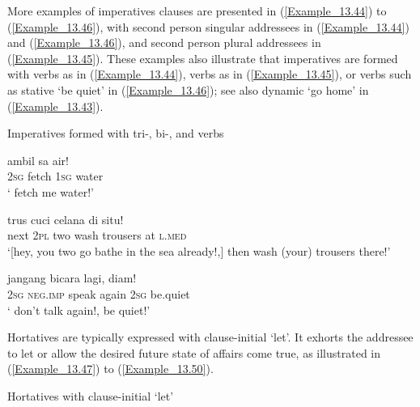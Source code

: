 More examples of imperatives clauses are presented in (\ref{Example_13.44}) to (\ref{Example_13.46}), with second person singular addressees in (\ref{Example_13.44}) and (\ref{Example_13.46}), and second person plural addressees in (\ref{Example_13.45}). These examples also illustrate that imperatives are formed with  verbs as in (\ref{Example_13.44}),  verbs as in (\ref{Example_13.45}), or  verbs such as stative  ‘be quiet’ in (\ref{Example_13.46}); see also  dynamic  ‘go home’ in (\ref{Example_13.43}).


\begin{styleExampleTitle}
Imperatives formed with tri-, bi-, and  verbs
\end{styleExampleTitle}

\ea
\label{Example_13.44}
 {ambil} {sa} {air!}\\ %
 \textsc{2sg}  fetch  \textsc{1sg}  water\\
\glt 
‘ fetch me water!’ \textstyleExampleSource{[081006-024-CvEx.0092]}
\z

\ea
\label{Example_13.45}
\gll {\ldots} {trus} {} {} {cuci} {celana} {di} {situ!}\\ %
 {}  next  \textsc{2pl}  two  wash  trousers  at  \textsc{l.med}\\
 ‘[hey, you two go bathe in the sea already!,] then  wash (your) trousers there!’ \textstyleExampleSource{[080917-006-CvHt.0007]}
\z

\ea
\label{Example_13.46}
 {jangang} {bicara} {lagi,} {} {diam!}\\ %
 \textsc{2sg}  \textsc{neg.imp}  speak  again  \textsc{2sg}  be.quiet\\
\glt 
‘ don’t talk again!,  be quiet!’ \textstyleExampleSource{[081029-004-Cv.0072]}
\z


Hortatives are typically expressed with clause-initial  ‘let’. It exhorts the addressee to let or allow the desired future state of affairs come true, as illustrated in (\ref{Example_13.47}) to (\ref{Example_13.50}).


\begin{styleExampleTitle}
Hortatives with clause-initial  ‘let’
\end{styleExampleTitle}

